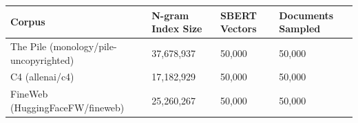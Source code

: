
\begin{table}[htbp]
\centering
\begin{tabular}{llll}
\toprule
Corpus & N-gram Index Size & SBERT Vectors & Documents Sampled \\
\midrule
The Pile (monology/pile-uncopyrighted) & 37,678,937 & 50,000 & 50,000 \\
C4 (allenai/c4) & 17,182,929 & 50,000 & 50,000 \\
FineWeb (HuggingFaceFW/fineweb) & 25,260,267 & 50,000 & 50,000 \\
\bottomrule
\end{tabular}
\end{table}

